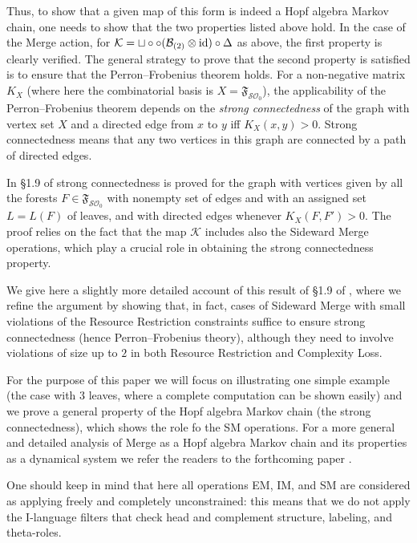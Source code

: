\documentclass[12pt]{amsart}
\numberwithin{equation}{section}
\def\cB{{\mathcal B}}
\def\cK{{\mathcal K}}
\def\cO{{\mathcal O}}
\def\cS{{\mathcal S}}
\def\fF{{\mathfrak F}}
\begin{document}
Thus, to show that a given map of this form is indeed a Hopf algebra Markov chain, one
needs to show that the two properties listed above hold. In the case of the Merge action,
for $\cK=\sqcup \circ \circ (\cB_{(2)}\otimes {\rm id}) \circ \Delta$ as above, the first property
is clearly verified. The general strategy to prove that the second property is satisfied
is to ensure that the Perron--Frobenius  theorem holds. For a non-negative matrix $K_X$
(where here the combinatorial basis is $X=\fF_{\cS\cO_0}$), the applicability of the
Perron--Frobenius  theorem depends on the {\em strong connectedness} of the graph
with vertex set $X$ and a directed edge from $x$ to $y$ iff $K_X(x,y)>0$. Strong connectedness
means that any two vertices in this graph are connected by a path of directed edges. 

\smallskip

In \S 1.9 of \cite{MCB} strong connectedness is proved for the graph with vertices
given by all the forests $F\in \fF_{\cS\cO_0}$ with nonempty set of edges
and with an assigned set $L=L(F)$ of leaves, and with directed edges 
whenever $K_X(F,F')>0$. The proof relies on the fact that the map $\cK$
includes also the Sideward Merge operations, which play a crucial role in
obtaining the strong connectedness property.

\smallskip

We give here a slightly more detailed account of this result of \S 1.9 of \cite{MCB},
where we refine the argument by showing that, in fact, cases of Sideward Merge
with small violations of the Resource Restriction constraints suffice to ensure
strong connectedness (hence Perron--Frobenius  theory), although they need
to involve violations of size up to $2$ in both Resource Restriction and 
Complexity Loss.

\smallskip

For the purpose of this paper we will focus on illustrating one simple example
(the case with $3$ leaves, where a complete computation can be shown easily)
and we prove a general property of the Hopf algebra Markov chain (the
strong connectedness), which shows the role fo the SM operations. For a more
general and detailed analysis of Merge as a Hopf algebra Markov chain and its
properties as a dynamical system we refer the readers to the forthcoming
paper \cite{MarSkig}. 

\smallskip

One should keep in mind that here all operations EM, IM, and SM
are considered as applying freely and completely unconstrained: this means that 
we do not apply the I-language filters that check head and complement structure, 
labeling, and theta-roles. 
\end{document}
